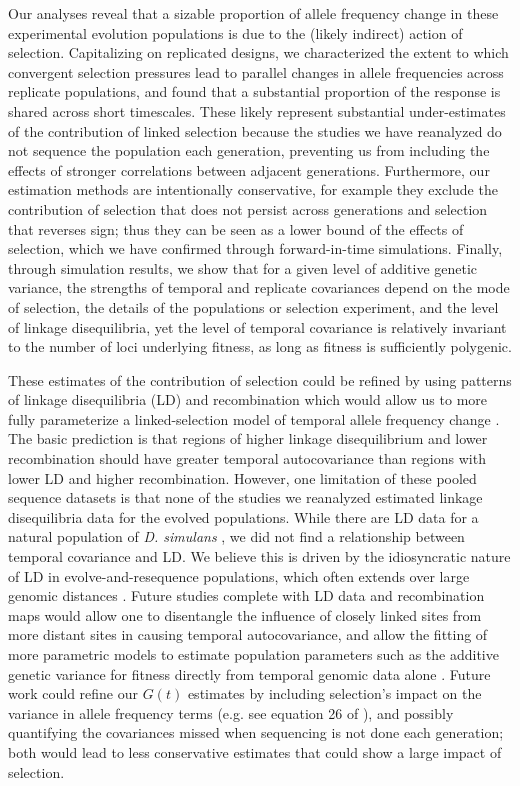 \documentclass[9pt,twocolumn,twoside]{pnas-new}
\begin{document}
Our analyses reveal that a sizable proportion of allele frequency change in
these experimental evolution populations is due to the (likely indirect) action
of selection. Capitalizing on replicated designs, we characterized the extent
to which convergent selection pressures lead to parallel changes in allele
frequencies across replicate populations, and found that a substantial
proportion of the response is shared across short timescales.  These likely
represent substantial under-estimates of the contribution of linked selection
because the studies we have reanalyzed do not sequence the population each
generation, preventing us from including the effects of stronger correlations
between adjacent generations. Furthermore, our estimation methods are
intentionally conservative, for example they exclude the contribution of
selection that does not persist across generations and selection that reverses
sign; thus they can be seen as a lower bound of the effects of selection, which
we have confirmed through forward-in-time simulations.  Finally, through
simulation results, we show that for a given level of additive genetic
variance, the strengths of temporal and replicate covariances depend on the
mode of selection, the details of the populations or selection experiment, and
the level of linkage disequilibria, yet the level of temporal covariance is
relatively invariant to the number of loci underlying fitness, as long as
fitness is sufficiently polygenic. 

These estimates of the contribution of selection could be refined by using
patterns of linkage disequilibria (LD) and recombination which would allow us
to more fully parameterize a linked-selection model of temporal allele
frequency change \cite{Buffalo2019-io}. The basic prediction is that regions of
higher linkage disequilibrium and lower recombination should have greater
temporal autocovariance than regions with lower LD and higher recombination.
However, one limitation of these pooled sequence datasets is that none of the
studies we reanalyzed estimated linkage disequilibria data for the evolved
populations.  While there are LD data for a natural population of \emph{D.
simulans} \cite{Signor2018-wg,Howie2018-ay},  we did not find a relationship
between temporal covariance and LD.  We believe this is driven by the
idiosyncratic nature of LD in evolve-and-resequence populations, which often
extends over large genomic distances \cite{Nuzhdin2013-gf,Kelly2019-dc}. Future
studies complete with LD data and recombination maps would allow one to
disentangle the influence of closely linked sites from more distant sites in
causing temporal autocovariance, and allow the fitting of more parametric
models to estimate population parameters such as the additive genetic variance
for fitness directly from temporal genomic data alone \cite{Buffalo2019-io}.
Future work could refine our $G(t)$ estimates by including selection's impact
on the variance in allele frequency terms (e.g. see equation 26 of
\cite{Buffalo2019-io}), and possibly quantifying the covariances missed when
sequencing is not done each generation; both would lead to less conservative
estimates that could show a large impact of selection.
\end{document}
